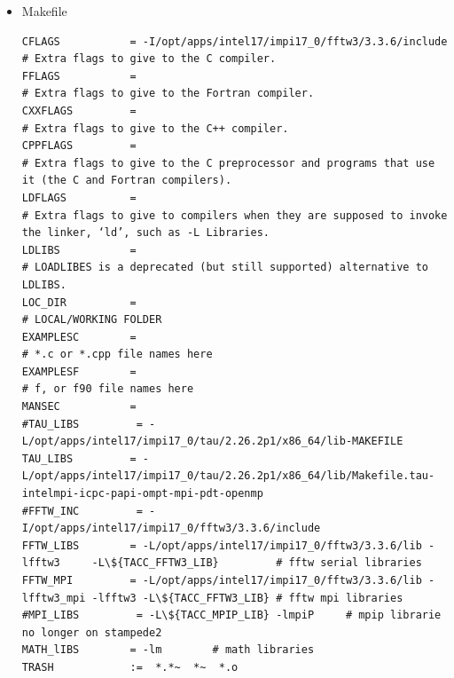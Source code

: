 \documentclass{article}
\begin{document}
\begin{itemize}
 \item Makefile
 \scriptsize
\begin{verbatim}
CFLAGS           = -I/opt/apps/intel17/impi17_0/fftw3/3.3.6/include   # Extra flags to give to the C compiler.
FFLAGS           =                                                    # Extra flags to give to the Fortran compiler.
CXXFLAGS         =                                                    # Extra flags to give to the C++ compiler.
CPPFLAGS         =                                                    # Extra flags to give to the C preprocessor and programs that use it (the C and Fortran compilers).
LDFLAGS          =                                                    # Extra flags to give to compilers when they are supposed to invoke the linker, ‘ld’, such as -L Libraries.
LDLIBS           =                                                    # LOADLIBES is a deprecated (but still supported) alternative to LDLIBS. 
LOC_DIR          =                                                    # LOCAL/WORKING FOLDER
EXAMPLESC        =                                                    # *.c or *.cpp file names here
EXAMPLESF        =                                                    # f, or f90 file names here
MANSEC           =
#TAU_LIBS         = -L/opt/apps/intel17/impi17_0/tau/2.26.2p1/x86_64/lib-MAKEFILE
TAU_LIBS         = -L/opt/apps/intel17/impi17_0/tau/2.26.2p1/x86_64/lib/Makefile.tau-intelmpi-icpc-papi-ompt-mpi-pdt-openmp
#FFTW_INC         = -I/opt/apps/intel17/impi17_0/fftw3/3.3.6/include 
FFTW_LIBS        = -L/opt/apps/intel17/impi17_0/fftw3/3.3.6/lib -lfftw3     -L\${TACC_FFTW3_LIB}         # fftw serial libraries
FFTW_MPI         = -L/opt/apps/intel17/impi17_0/fftw3/3.3.6/lib -lfftw3_mpi -lfftw3 -L\${TACC_FFTW3_LIB} # fftw mpi libraries
#MPI_LIBS         = -L\${TACC_MPIP_LIB} -lmpiP     # mpip librarie no longer on stampede2
MATH_lIBS        = -lm        # math libraries
TRASH            :=  *.*~  *~  *.o


\end{verbatim}
\end{itemize}
\end{document}
